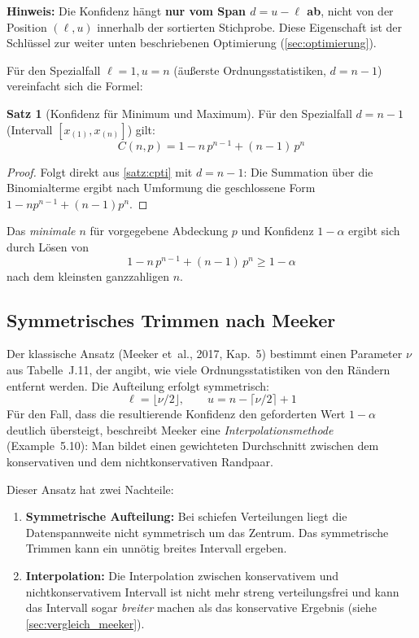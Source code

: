 \documentclass[10pt,a4paper,twocolumn]{article}
\theoremstyle{definition}
\newtheorem{satz}[definition]{Satz}
\newcommand{\hinweis}[1]{%
    \begin{center}
    \colorbox{noteblue}{\parbox{0.92\linewidth}{\small\textbf{Hinweis:} #1}}
    \end{center}
}
\begin{document}
\hinweis{Die Konfidenz hängt \textbf{nur vom Span $d = u - \ell$ ab},
nicht von der Position $(\ell, u)$ innerhalb der sortierten Stichprobe.
Diese Eigenschaft ist der Schlüssel zur weiter unten beschriebenen Optimierung
(\cref{sec:optimierung}).}

Für den Spezialfall $\ell=1, u=n$ (äußerste Ordnungsstatistiken,
$d = n-1$) vereinfacht sich die Formel:

\begin{satz}[Konfidenz für Minimum und Maximum]
\label{satz:minmax}
Für den Spezialfall $d = n-1$ (Intervall $[x_{(1)}, x_{(n)}]$) gilt:
\[
    C(n, p) = 1 - n\,p^{n-1} + (n-1)\,p^n
\]
\end{satz}

\begin{proof}
Folgt direkt aus \cref{satz:cpti} mit $d = n-1$: Die Summation
über die Binomialterme ergibt nach Umformung die geschlossene Form
$1 - np^{n-1} + (n-1)p^n$.
\end{proof}

Das \emph{minimale $n$} für vorgegebene Abdeckung $p$ und
Konfidenz $1-\alpha$ ergibt sich durch Lösen von
\begin{equation}
    1 - n\,p^{n-1} + (n-1)\,p^n \geq 1 - \alpha
    \label{eq:min_n_two}
\end{equation}
nach dem kleinsten ganzzahligen $n$.

\subsection{Symmetrisches Trimmen nach Meeker}
\label{sec:meeker_symm}

Der klassische Ansatz (Meeker et~al., 2017, Kap.~5) bestimmt einen
Parameter $\nu$ aus Tabelle~J.11, der angibt, wie viele
Ordnungsstatistiken von den Rändern entfernt werden. Die Aufteilung
erfolgt symmetrisch:
\[
    \ell = \lfloor \nu/2 \rfloor, \qquad u = n - \lceil \nu/2 \rceil + 1
\]
Für den Fall, dass die resultierende Konfidenz den geforderten Wert
$1-\alpha$ deutlich übersteigt, beschreibt Meeker eine
\emph{Interpolationsmethode} (Example~5.10): Man bildet einen
gewichteten Durchschnitt zwischen dem konservativen und dem
nichtkonservativen Randpaar.

Dieser Ansatz hat zwei Nachteile:
\begin{enumerate}[leftmargin=*]
    \item \textbf{Symmetrische Aufteilung:} Bei schiefen Verteilungen
    liegt die Datenspannweite nicht symmetrisch um das Zentrum. Das
    symmetrische Trimmen kann ein unnötig breites Intervall ergeben.
    \item \textbf{Interpolation:} Die Interpolation zwischen konservativem
    und nichtkonservativem Intervall ist nicht mehr streng verteilungsfrei
    und kann das Intervall sogar \emph{breiter} machen als das konservative
    Ergebnis (siehe \cref{sec:vergleich_meeker}).
\end{enumerate}
\end{document}
